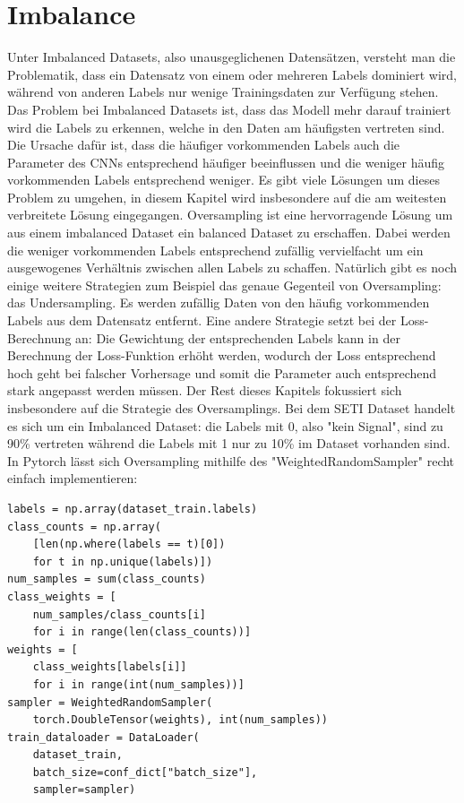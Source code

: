 \documentclass[11pt, a4paper]{article}
\begin{document}
\section{Imbalance}
Unter Imbalanced Datasets, also unausgeglichenen Datensätzen, versteht man die Problematik, dass ein Datensatz von einem oder mehreren Labels dominiert wird, während von anderen Labels nur wenige Trainingsdaten zur Verfügung stehen. Das Problem bei Imbalanced Datasets ist, dass das Modell mehr darauf trainiert wird die Labels zu erkennen, welche in den Daten am häufigsten vertreten sind. Die Ursache dafür ist, dass die häufiger vorkommenden Labels auch die Parameter des CNNs entsprechend häufiger beeinflussen und die weniger häufig vorkommenden Labels entsprechend weniger. Es gibt viele Lösungen um dieses Problem zu umgehen, in diesem Kapitel wird insbesondere auf die am weitesten verbreitete Lösung eingegangen.
\newline
Oversampling ist eine hervorragende Lösung um aus einem imbalanced Dataset ein balanced Dataset zu erschaffen. Dabei werden die weniger vorkommenden Labels entsprechend zufällig vervielfacht um ein ausgewogenes Verhältnis zwischen allen Labels zu schaffen. Natürlich gibt es noch einige weitere Strategien zum Beispiel das genaue Gegenteil von Oversampling: das Undersampling. Es werden zufällig Daten von den häufig vorkommenden Labels aus dem Datensatz entfernt. Eine andere Strategie setzt bei der Loss-Berechnung an: Die Gewichtung der entsprechenden Labels kann in der Berechnung der Loss-Funktion erhöht werden, wodurch der Loss entsprechend hoch geht bei falscher Vorhersage und somit die Parameter auch entsprechend stark angepasst werden müssen. Der Rest dieses Kapitels fokussiert sich insbesondere auf die Strategie des Oversamplings.
\newline
Bei dem SETI Dataset handelt es sich um ein Imbalanced Dataset: die Labels mit 0, also "kein Signal", sind zu 90\% vertreten während die Labels mit 1 nur zu 10\% im Dataset vorhanden sind. In Pytorch lässt sich Oversampling mithilfe des "WeightedRandomSampler" recht einfach implementieren:
\begin{lstlisting}
labels = np.array(dataset_train.labels)
class_counts = np.array(
	[len(np.where(labels == t)[0]) 
	for t in np.unique(labels)])
num_samples = sum(class_counts)
class_weights = [
	num_samples/class_counts[i] 
	for i in range(len(class_counts))]
weights = [
	class_weights[labels[i]] 
	for i in range(int(num_samples))]
sampler = WeightedRandomSampler(
	torch.DoubleTensor(weights), int(num_samples))
train_dataloader = DataLoader(
	dataset_train, 
	batch_size=conf_dict["batch_size"], 
	sampler=sampler)
\end{lstlisting}
\end{document}
